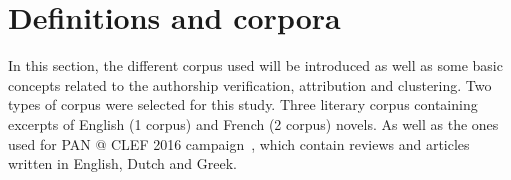 \section{Definitions and corpora \label{sec:definitions_and_corpora}}

In this section, the different corpus used will be introduced as well as some basic concepts related to the authorship verification, attribution and clustering.
Two types of corpus were selected for this study.
Three literary corpus containing excerpts of English (1 corpus) and French (2 corpus) novels.
As well as the ones used for PAN @ CLEF 2016 campaign~\cite{pan16}, which contain reviews and articles written in English, Dutch and Greek.




